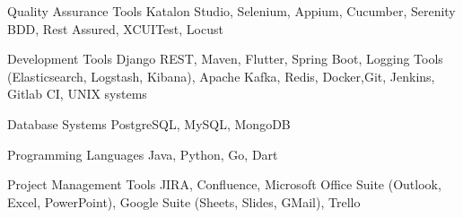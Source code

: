 

\begin{cvskills}

  \cvskill
    {Quality Assurance Tools} %
    {Katalon Studio, Selenium, Appium, Cucumber, Serenity BDD, Rest Assured, XCUITest, Locust} %

  \cvskill
    {Development Tools} %
    {Django REST, Maven, Flutter, Spring Boot, Logging Tools (Elasticsearch, Logstash, Kibana), Apache Kafka, Redis, Docker,\newline Git, Jenkins, Gitlab CI, UNIX systems} %

  \cvskill
    {Database Systems} %
    {PostgreSQL, MySQL, MongoDB} %

  \cvskill
    {Programming Languages} %
    {Java, Python, Go, Dart} %

  \cvskill
    {Project Management Tools} %
    {JIRA, Confluence, Microsoft Office Suite (Outlook, Excel, PowerPoint), Google Suite (Sheets, Slides, GMail), Trello} %

\end{cvskills}
